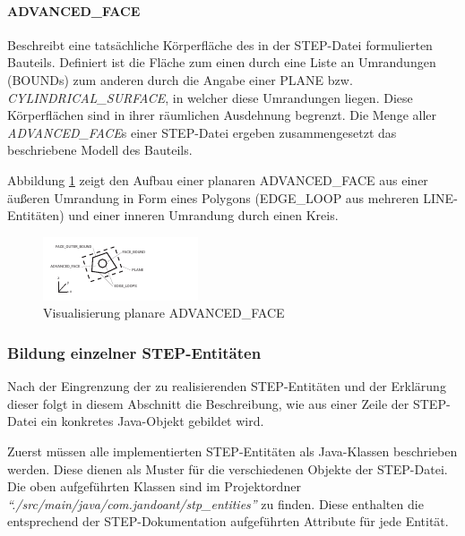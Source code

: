 \paragraph{ADVANCED\_FACE}

Beschreibt eine tatsächliche Körperfläche des in der STEP-Datei formulierten Bauteils. Definiert ist die Fläche zum einen durch eine Liste an Umrandungen (BOUNDs) zum anderen durch die Angabe einer PLANE bzw. \textit{CYLINDRICAL\_SURFACE}, in welcher diese Umrandungen liegen. Diese Körperflächen sind in ihrer räumlichen Ausdehnung begrenzt. Die Menge aller \textit{ADVANCED\_FACE}s einer STEP-Datei ergeben zusammengesetzt das beschriebene Modell des Bauteils. 

Abbildung \ref{fig:advancedfaceentity} zeigt den Aufbau einer planaren ADVANCED\_FACE aus einer äußeren Umrandung in Form eines Polygons (EDGE\_LOOP aus mehreren LINE-Entitäten) und einer inneren Umrandung durch einen Kreis.  

\begin{figure}[h]
	\centering
	
	\includegraphics[width=\linewidth]{img/advancedface_entity.pdf}
	
	\caption{Visualisierung planare ADVANCED\_FACE}
	\label{fig:advancedfaceentity}
	
\end{figure}

\subsubsection{Bildung einzelner STEP-Entitäten}
\label{sec:string2entity}


Nach der Eingrenzung der zu realisierenden STEP-Entitäten und der Erklärung dieser folgt in diesem Abschnitt die Beschreibung, wie aus einer Zeile der STEP-Datei ein konkretes Java-Objekt gebildet wird. 

Zuerst müssen alle implementierten STEP-Entitäten als Java-Klassen beschrieben werden. Diese dienen als Muster für die verschiedenen Objekte der STEP-Datei. Die oben aufgeführten Klassen sind im Projektordner \textit{"`./src/main/java/com.jandoant/stp\_entities"'} zu finden. Diese enthalten die entsprechend der STEP-Dokumentation aufgeführten Attribute für jede Entität. 

